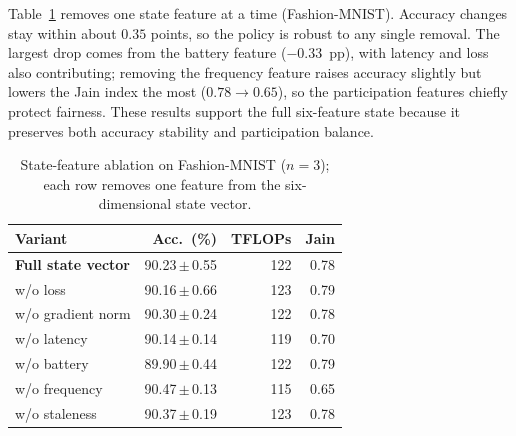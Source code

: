 \documentclass[journal]{IEEEtran}
\newcommand{\revision}[1]{#1}
\begin{document}
\revision{Table~\ref{tab:ablation} removes one state feature at a time (Fashion-MNIST). Accuracy changes stay within about $0.35$ points, so the policy is robust to any single removal. The largest drop comes from the battery feature ($-0.33$~pp), with latency and loss also contributing; removing the frequency feature raises accuracy slightly but lowers the Jain index the most ($0.78\!\to\!0.65$), so the participation features chiefly protect fairness. These results support the full six-feature state because it preserves both accuracy stability and participation balance.}

\begin{table}[H]
\centering
\color{black}
\caption{State-feature ablation on Fashion-MNIST ($n=3$); each row removes one feature from the six-dimensional state vector.}
\label{tab:ablation}
\scriptsize
\setlength{\tabcolsep}{3.4pt}
\renewcommand{\arraystretch}{0.92}
\begin{tabular*}{\columnwidth}{@{\extracolsep{\fill}}lrrr@{}}
\toprule
Variant & Acc.\ (\%) & TFLOPs & Jain \\
\midrule
\textbf{Full state vector} & 90.23\,$\pm$\,0.55 & 122 & 0.78 \\
w/o loss & 90.16\,$\pm$\,0.66 & 123 & 0.79 \\
w/o gradient norm & 90.30\,$\pm$\,0.24 & 122 & 0.78 \\
w/o latency & 90.14\,$\pm$\,0.14 & 119 & 0.70 \\
w/o battery & 89.90\,$\pm$\,0.44 & 122 & 0.79 \\
w/o frequency & 90.47\,$\pm$\,0.13 & 115 & 0.65 \\
w/o staleness & 90.37\,$\pm$\,0.19 & 123 & 0.78 \\
\bottomrule
\end{tabular*}
\vspace{0mm}
\end{table}


\FloatBarrier
\end{document}
